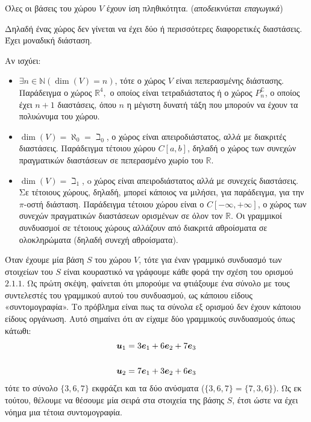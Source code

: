 \documentclass[main.tex]{subfiles}
\begin{document}
	\begin{theorem}
		Όλες οι βάσεις του χώρου $V$ έχουν ίση πληθικότητα. (\textit{αποδεικνύεται επαγωγικά})
 	\end{theorem}
 	Δηλαδή ένας χώρος δεν γίνεται να έχει δύο ή περισσότερες διαφορετικές διαστάσεις. Έχει μοναδική διάσταση.

 	Αν ισχύει:
 	\begin{itemize}
 		\item ${\exists n \in \mathbb{N}(\dim(V) = n)}$, τότε ο χώρος $V$ είναι πεπερασμένης διάστασης. Παράδειγμα ο χώρος $\mathbb{R}^4,$ ο οποίος είναι τετραδιάστατος ή ο χώρος $P^\mathbb{C}_n$, ο οποίος έχει ${n+1}$ διαστάσεις, όπου $n$ η μέγιστη δυνατή τάξη που μπορούν να έχουν τα πολυώνυμα του χώρου.
 		\item $\dim(V) = \aleph_0 = \beth_0$, ο χώρος είναι απειροδιάστατος, αλλά με διακριτές διαστάσεις. Παράδειγμα τέτοιου χώρου $C[a,b]$, δηλαδή ο χώρος των συνεχών πραγματικών διαστάσεων σε πεπερασμένο χωρίο του $\mathbb{R}$.
 		\item ${\dim(V) = \beth_1}$, o χώρος είναι απειροδιάστατος αλλά με συνεχείς διαστάσεις. Σε τέτοιους χώρους, δηλαδή, μπορεί κάποιος να μιλήσει, για παράδειγμα, για την $\pi$-οστή διάσταση. Παράδειγμα τέτοιου χώρου είναι ο $C[-\infty,+\infty]$, ο χώρος των συνεχών πραγματικών διαστάσεων ορισμένων σε όλον τον $\mathbb{R}$. Οι γραμμικοί συνδυασμοί σε τέτοιους χώρους αλλάζουν από διακριτά αθροίσματα σε ολοκληρώματα (δηλαδή συνεχή αθροίσματα).
 	\end{itemize}
 
 	Όταν έχουμε μία βάση $S$ του χώρου $V$, τότε για έναν γραμμικό συνδυασμό των στοιχείων του $S$ είναι κουραστικό να γράφουμε κάθε φορά την σχέση του ορισμού $2.1.1$. Ως πρώτη σκέψη, φαίνεται ότι μπορούμε να φτιάξουμε ένα σύνολο με τους συντελεστές του γραμμικού αυτού του συνδυασμού, ως κάποιου είδους «συντομογραφία». Το πρόβλημα είναι πως τα σύνολα εξ ορισμού δεν έχουν κάποιου είδους οργάνωση. Αυτό σημαίνει ότι αν είχαμε δύο γραμμικούς συνδυασμούς όπως κάτωθι:
 	\begin{align*}
 		\boldsymbol{u}_1 &= 3\boldsymbol{e}_1 + 6\boldsymbol{e}_2 + 7\boldsymbol{e}_3\\
 		\newline\\
 		\boldsymbol{u}_2 &= 7\boldsymbol{e}_1 + 3\boldsymbol{e}_2 + 6\boldsymbol{e}_3
 	\end{align*}
 	τότε το σύνολο $\{3, 6, 7\}$ εκφράζει και τα δύο ανύσματα ($\{3,6,7\} = \{7,3,6\}$). Ως εκ τούτου, θέλουμε να θέσουμε μία σειρά στα στοιχεία της βάσης $S$, έτσι ώστε να έχει νόημα μια τέτοια συντομογραφία.
 	
\end{document}
